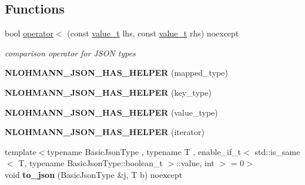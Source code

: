 \subsection*{Functions}
\begin{DoxyCompactItemize}
\item 
bool \mbox{\hyperlink{namespacenlohmann_1_1detail_a09169efff3bd1771fff29bd92cea19e0}{operator$<$}} (const \mbox{\hyperlink{namespacenlohmann_1_1detail_a90aa5ef615aa8305e9ea20d8a947980f}{value\+\_\+t}} lhs, const \mbox{\hyperlink{namespacenlohmann_1_1detail_a90aa5ef615aa8305e9ea20d8a947980f}{value\+\_\+t}} rhs) noexcept
\begin{DoxyCompactList}\small\item\em comparison operator for J\+S\+ON types \end{DoxyCompactList}\item 
\mbox{\label{namespacenlohmann_1_1detail_a7b2601c238073c43a07862768b319cf8}} 
{\bfseries N\+L\+O\+H\+M\+A\+N\+N\+\_\+\+J\+S\+O\+N\+\_\+\+H\+A\+S\+\_\+\+H\+E\+L\+P\+ER} (mapped\+\_\+type)
\item 
\mbox{\label{namespacenlohmann_1_1detail_ad19328f0c4ffe2890ecafb7c89e0355b}} 
{\bfseries N\+L\+O\+H\+M\+A\+N\+N\+\_\+\+J\+S\+O\+N\+\_\+\+H\+A\+S\+\_\+\+H\+E\+L\+P\+ER} (key\+\_\+type)
\item 
\mbox{\label{namespacenlohmann_1_1detail_af3e900eb1e0b107c812f7babbb94e69e}} 
{\bfseries N\+L\+O\+H\+M\+A\+N\+N\+\_\+\+J\+S\+O\+N\+\_\+\+H\+A\+S\+\_\+\+H\+E\+L\+P\+ER} (value\+\_\+type)
\item 
\mbox{\label{namespacenlohmann_1_1detail_a6648328c4b1466fdc48f1fcfbff23e2f}} 
{\bfseries N\+L\+O\+H\+M\+A\+N\+N\+\_\+\+J\+S\+O\+N\+\_\+\+H\+A\+S\+\_\+\+H\+E\+L\+P\+ER} (iterator)
\item 
\mbox{\label{namespacenlohmann_1_1detail_a1a804b98cbe89b7e44b698f2ca860490}} 
{\footnotesize template$<$typename Basic\+Json\+Type , typename T , enable\+\_\+if\+\_\+t$<$ std\+::is\+\_\+same$<$ T, typename Basic\+Json\+Type\+::boolean\+\_\+t $>$\+::value, int $>$  = 0$>$ }\\void {\bfseries to\+\_\+json} (Basic\+Json\+Type \&j, T b) noexcept
\item 

\end{DoxyCompactItemize}
